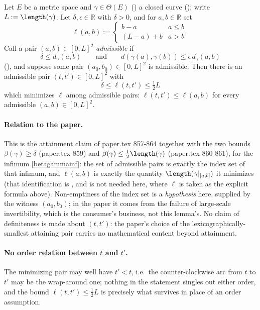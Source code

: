 \begin{lemma}
  \label{typeI-cut-minimal-pair}
  Let $E$ be a metric space and $\gamma \in \Theta(E)$ () a closed curve
  (); write $L := \length(\gamma)$. Let $\delta,\epsilon \in \mathbb{R}$
  with $\delta > 0$, and for $a,b \in \mathbb{R}$ set
  \[
    \ell(a,b) := \begin{cases} b-a & a \le b \\ (L-a)+b & a > b \end{cases}
    .
  \]
  Call a pair $(a,b) \in [0,L]^2$ \emph{admissible} if
  \[
    \delta \le d_\gamma(a,b)
    \qquad\text{and}\qquad
    d(\gamma(a),\gamma(b)) \le \epsilon\, d_\gamma(a,b)
  \]
  (), and suppose some pair $(a_0,b_0) \in [0,L]^2$ is admissible. Then there is an
  admissible pair $(t,t') \in [0,L]^2$ with
  \[
    \delta \le \ell(t,t') \le \tfrac{1}{2}L
  \]
  which minimizes $\ell$ among admissible pairs: $\ell(t,t') \le \ell(a,b)$ for every admissible
  $(a,b) \in [0,L]^2$.

  \paragraph{Relation to the paper.} This is the attainment claim of paper.tex 857-864 together
  with the two bounds $\beta(\gamma) \ge \delta$ (paper.tex 859) and $\beta(\gamma) \le
  \tfrac12\length(\gamma)$ (paper.tex 860-861), for the infimum \eqref{betagammainf}: the set of
  admissible pairs is exactly the index set of that infimum, and $\ell(a,b)$ is exactly the
  quantity $\length(\gamma|_{[a,b]})$ it minimizes (that identification is
  , and is not needed here, where $\ell$ is taken as the explicit formula
  above). Non-emptiness of the index set is a \emph{hypothesis} here, supplied by the witness
  $(a_0,b_0)$; in the paper it comes from the failure of large-scale invertibility, which is the
  consumer's business, not this lemma's. No claim of definiteness is made about $(t,t')$: the
  paper's choice of the lexicographically-smallest attaining pair carries no mathematical content
  beyond attainment.

  \paragraph{No order relation between $t$ and $t'$.} The minimizing pair may well have $t' < t$,
  i.e.\ the counter-clockwise arc from $t$ to $t'$ may be the wrap-around one; nothing in the
  statement singles out either order, and the bound $\ell(t,t') \le \tfrac12 L$ is precisely what
  survives in place of an order assumption.
\end{lemma}
